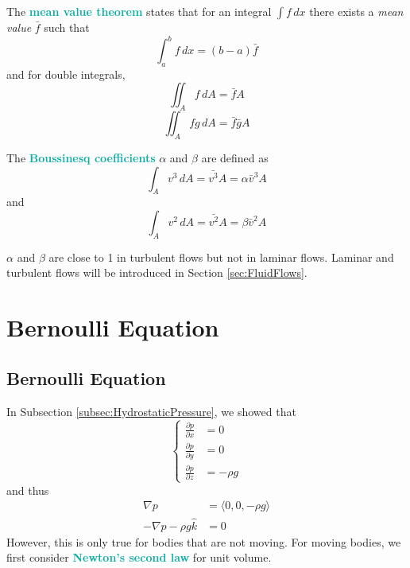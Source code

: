\documentclass[twoside]{article}
\newcommand{\highlightbluetext}[1]{\textcolor[HTML]{09ACA6}{\textbf{#1}}}
\numberwithin{equation}{section}
\begin{document}
	The \highlightbluetext{mean value theorem} states that for an integral $\int f \, dx$ there exists a \emph{mean value} $\bar{f}$ such that
	\begin{equation}
		\int_a^b f \, dx = (b-a) \bar{f}
		\label{eq:MeanValueTheorem1D}
	\end{equation}
	and for double integrals,
	\begin{equation}
		\iint_A f \, dA = \bar{f} A
		\label{eq:MeanValueTheorem2D}
	\end{equation}
	\begin{equation}
		\iint_A fg \, dA = \bar{f} \bar{g} A
		\label{eq:MeanValueTheoremFG2D}
	\end{equation}
	
	The \highlightbluetext{Boussinesq coefficients} $\alpha$ and $\beta$ are defined as
	\begin{equation}
		\int_A v^3 \, dA = \bar{v^3} A = \alpha \bar{v}^3 A
	\end{equation}
	and
	\begin{equation}
		\int_A v^2 \, dA = \bar{v^2} A = \beta \bar{v}^2 A
	\end{equation}
	
	$\alpha$ and $\beta$ are close to 1 in turbulent flows but not in laminar flows. Laminar and turbulent flows will be introduced in Section \ref{sec:FluidFlows}.
	
	\newpage
	
	\section{Bernoulli Equation}
	\label{sec:BernoulliEquation}
	
	\subsection{Bernoulli Equation}
	\label{subsec:BernoulliEquation}
	
	In Subsection \ref{subsec:HydrostaticPressure}, we showed that
	\begin{equation*}
		\begin{cases}
			\frac{\partial p}{\partial x} &= 0 \\
			\frac{\partial p}{\partial y} &= 0 \\
			\frac{\partial p}{\partial z} &= -\rho g
		\end{cases}
	\end{equation*}
	and thus
	\begin{align*}
		\nabla p &= \langle 0, 0, -\rho g \rangle \\
		-\nabla p-\rho g \hat{k} &= 0
	\end{align*}
	However, this is only true for bodies that are not moving. For moving bodies, we first consider \highlightbluetext{Newton's second law} for unit volume.
	
\end{document}
